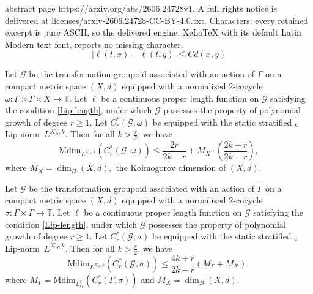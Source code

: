 \documentclass[10pt,a4paper]{amsart}
\newcommand{\clipnorm}{$_{\text{\rm c}}$Lip-norm}
\begin{document}
abstract page https://arxiv.org/abs/2606.24728v1. A full rights notice is delivered at licenses/arxiv-2606.24728-CC-BY-4.0.txt. Characters: every retained excerpt is pure ASCII, so the delivered engine, XeLaTeX with its default Latin Modern text font, reports no missing character.
\begin{equation} \label{Lip-length}
    |\ell(t, x) - \ell(t, y)| \le C d(x, y)
\end{equation}

\begin{thm} \label{general cocycle bound}
Let $\mathcal{G}$ be the transformation groupoid associated with an action of $\Gamma$ on a compact metric space $(X, d)$ equipped with a normalized $2$-cocycle $\omega : \Gamma \times \Gamma \times X \rightarrow \mathbb T.$ Let $\ell$ be a continuous proper length function on $\mathcal G$ satisfying the condition \eqref{Lip-length}, under which $\mathcal G$ possesses the property of polynomial growth of degree $r \geq 1.$ Let $C_r^{\ast}(\mathcal {G}, \omega)$ be equipped with the static stratified \clipnorm\ $L^{\mathcal{K}_{S}, k}$. Then for all $k > \frac{r}{2}$, we have
\begin{displaymath}\mathrm{Mdim}_{L^{\mathcal{K}_{S},k}} (C_r^{\ast}(\mathcal{G}, \omega)) \leq \frac {2 r} {2 k - r} + M_X \cdot \left (\frac {2 k + r} {2 k - r} \right ), \end{displaymath}
where $M_X = \dim_B (X, d),$ the Kolmogorov dimension of $(X,d)$.
\end{thm}

\begin{thm}\label{betterbound}
Let $\mathcal{G}$ be the transformation groupoid associated with an action of $\Gamma$ on a compact metric space $(X, d)$ equipped with a normalized $2$-cocycle $\sigma : \Gamma \times \Gamma \rightarrow \mathbb T.$ Let $\ell$ be a continuous proper length function on $\mathcal G$ satisfying the condition \eqref{Lip-length}, under which $\mathcal G$ possesses the property of polynomial growth of degree $r \geq 1.$ Let $C_r^{\ast}(\mathcal {G}, \sigma)$ be equipped with the static stratified \clipnorm\ $L^{\mathcal{K}_{S}, k}$. Then for all $k > \frac{r}{2}$, we have
\begin{displaymath}\mathrm{Mdim}_{L^{\mathcal{K}_{S},k}} (C_r^{\ast}(\mathcal{G}, \sigma)) \leq  \frac {4 k + r} {2 k - r} \left( M_{\Gamma} + M_X \right), \end{displaymath}
where $M_{\Gamma}  = \mathrm {Mdim}_{L_{\ell_{\Gamma}}^{k}} \left (C_r^{\ast} (\Gamma, \sigma) \right )$ and $M_X = \dim_B (X, d).$ 
\end{thm}
\end{document}

